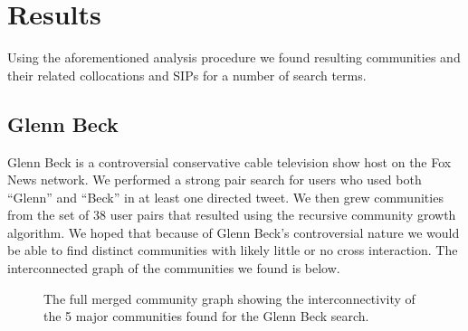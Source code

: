 \section{Results}
Using the aforementioned analysis procedure we found resulting communities and their related collocations and SIPs for a number of search terms.

\subsection{Glenn Beck}
Glenn Beck is a controversial conservative cable television show host on the Fox News network.  We performed a strong pair search for users who used both ``Glenn'' and ``Beck'' in at least one directed tweet.  We then grew communities from the set of 38 user pairs that resulted using the recursive community growth algorithm.  We hoped that because of Glenn Beck's controversial nature we would be able to find distinct communities with likely little or no cross interaction.  The interconnected graph of the communities we found is below.

\begin{figure}
  \begin{center}
  \end{center}
  \caption{The full merged community graph showing the interconnectivity of the 5 major communities found for the Glenn Beck search.}
  \label{figure:gb-full}
\end{figure}
